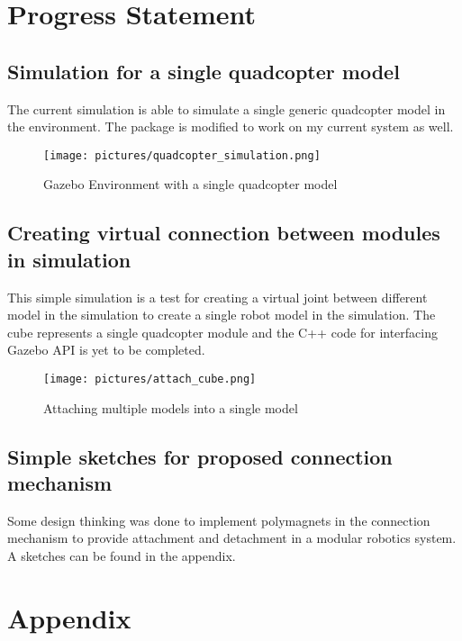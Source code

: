 \documentclass[12pt,A4]{article}
\begin{document}
	\pagebreak
	
	\section{Progress Statement}
	
	\subsection{Simulation for a single quadcopter model}
	
	The current simulation is able to simulate a single generic quadcopter model in the environment. The package is modified to work on my current system as well.
	
	\begin{figure}[h!]
		\texttt{[image: pictures/quadcopter\_simulation.png]}
		\caption{Gazebo Environment with a single quadcopter model}
	\end{figure}

	
	\subsection{Creating virtual connection between modules in simulation}
	
	This simple simulation is a test for creating a virtual joint between different model in the simulation to create a single robot model in the simulation. The cube represents a single quadcopter module and the C++ code for interfacing Gazebo API is yet to be completed.\\
	
	\begin{figure}[h!]
		\texttt{[image: pictures/attach\_cube.png]}
		\caption{Attaching multiple models into a single model}
	\end{figure}
	
	\subsection{Simple sketches for proposed connection mechanism}
	
	Some design thinking was done to implement polymagnets in the connection mechanism to provide attachment and detachment in a modular robotics system. A sketches can be found in the appendix.
	
	\pagebreak

	\section{Appendix}
\end{document}
